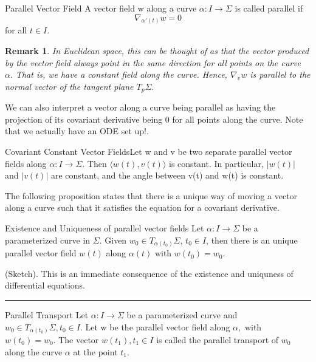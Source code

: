 \documentclass[twoside]{article}
\newtheorem{remark}[theorem]{Remark}
\newenvironment{proof}{{\bf Proof:}}{\hfill\rule{2mm}{2mm}}
\begin{document}
\begin{definition_exam}{Parallel Vector Field}{} A vector field w along a curve $\alpha: I \rightarrow \Sigma$ is called parallel if 
$$
\nabla_{\alpha'(t)}w = 0
$$
for all $t \in I.$
\end{definition_exam}

\begin{remark}In Euclidean space, this can be thought of as that the vector produced by the vector field always point in the same direction for all points on the curve $\alpha.$ That is, we have a constant field along the curve. Hence, $\nabla_{v}w$ is parallel to the normal vector of the tangent plane $T_p \Sigma.$
\end{remark}

We can also interpret a vector along a curve being parallel as having the projection of its covariant derivative being 0 for all points along the curve. Note that we actually have an ODE set up!.

\begin{proposition_exam}{Covariant Constant Vector Fields}{}Let w and v be two separate parallel vector fields along $\alpha: I \rightarrow \Sigma.$ Then $\langle w(t), v(t) \rangle$ is constant. In particular, $|w(t)|$ and $|v(t)|$ are constant, and the angle between v(t) and w(t) is constant.
\end{proposition_exam}
The following proposition states that there is a unique way of moving a vector along a curve such that it satisfies the equation for a covariant derivative.
\begin{proposition_exam}{Existence and Uniqueness of parallel vector fields}{} Let $\alpha: I \rightarrow \Sigma$ be a parameterized curve in $\Sigma$. Given $w_0 \in T_{\alpha(t_0)}\Sigma$, $t_0 \in I$, then there is an unique parallel vector field $w(t)$ along $\alpha(t)$ with $w(t_0) = w_0.$
\end{proposition_exam}

\begin{proof}(Sketch). This is an immediate consequence of the existence and uniquness of differential equations.
\end{proof}

\begin{definition_exam}{Parallel Transport}{} Let $\alpha: I \rightarrow \Sigma$ be a parameterized curve and $w_0 \in T_{\alpha(t_0)}\Sigma, t_0 \in I.$ Let w be the parallel vector field along $\alpha,$ with $w(t_0) = w_0.$ The vector $w(t_1), t_1 \in I$ is called the parallel transport of $w_0$ along the curve $\alpha$ at the point $t_1.$
\end{definition_exam}
\end{document}
